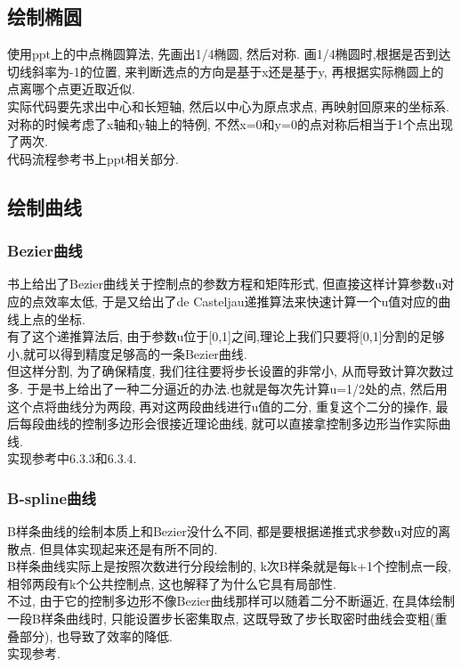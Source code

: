 \documentclass[a4paper,UTF8]{article}
\theoremstyle{definition}
\begin{document}
\subsection{绘制椭圆}
\indent 使用ppt上的中点椭圆算法, 先画出1/4椭圆, 然后对称. 画1/4椭圆时,根据是否到达切线斜率为-1的位置, 来判断选点的方向是基于x还是基于y, 再根据实际椭圆上的点离哪个点更近取近似.\\
\indent 实际代码要先求出中心和长短轴, 然后以中心为原点求点, 再映射回原来的坐标系.\\
\indent 对称的时候考虑了x轴和y轴上的特例, 不然x=0和y=0的点对称后相当于1个点出现了两次.\\
\indent 代码流程参考书上ppt相关部分.

\subsection{绘制曲线}
\subsubsection{Bezier曲线} 
书上给出了Bezier曲线关于控制点的参数方程和矩阵形式, 但直接这样计算参数u对应的点效率太低, 于是又给出了de Casteljau递推算法来快速计算一个u值对应的曲线上点的坐标.\\
\indent 有了这个递推算法后, 由于参数u位于[0,1]之间,理论上我们只要将[0,1]分割的足够小,就可以得到精度足够高的一条Bezier曲线.\\
\indent 但这样分割, 为了确保精度, 我们往往要将步长设置的非常小, 从而导致计算次数过多. 于是书上给出了一种二分逼近的办法.也就是每次先计算u=1/2处的点, 然后用这个点将曲线分为两段, 再对这两段曲线进行u值的二分, 重复这个二分的操作, 最后每段曲线的控制多边形会很接近理论曲线, 就可以直接拿控制多边形当作实际曲线.\\
\indent 实现参考\cite{sun_2006}中6.3.3和6.3.4.
\subsubsection{B-spline曲线}
B样条曲线的绘制本质上和Bezier没什么不同, 都是要根据递推式求参数u对应的离散点. 但具体实现起来还是有所不同的.\\
\indent B样条曲线实际上是按照次数进行分段绘制的, k次B样条就是每k+1个控制点一段, 相邻两段有k个公共控制点, 这也解释了为什么它具有局部性.\\
\indent 不过, 由于它的控制多边形不像Bezier曲线那样可以随着二分不断逼近, 在具体绘制一段B样条曲线时, 只能设置步长密集取点, 这既导致了步长取密时曲线会变粗(重叠部分), 也导致了效率的降低.\\
\indent 实现参考\cite{bspline_web}.
\end{document}
